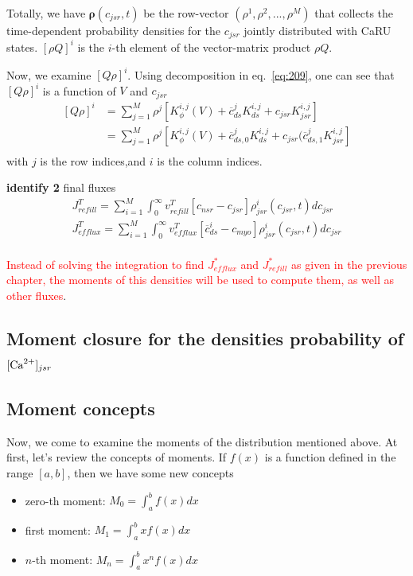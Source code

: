 Totally, we have $\mathbf{\rho} (c_{jsr},t)$ be the row-vector
$(\rho^1, \rho^2, ...,\rho^M)$ that collects the time-dependent
probability densities for the $c_{jsr}$ jointly distributed with CaRU
states. $[\rho Q]^i$ is the $i$-th element of the vector-matrix
product $\rho Q$.

Now, we examine $[Q\rho]^i$. Using decomposition in
eq.~\eqref{eq:209}, one can see that $[Q \rho ]^i$ is a function of
$V$ and $c_{jsr}$
\begin{equation}
  \label{eq:216}
  \begin{split}
    [Q\rho]^i &= \sum_{j=1}^M \rho^j[ K^{i,j}_\phi(V) +
    \overline{c}^j_{ds}K^{i,j}_{ds} +  c_{jsr} K^{i,j}_{jsr} ] \\
    &= \sum_{j=1}^M \rho^j[ K^{i,j}_\phi(V) + \overline{c}^j_{ds,0}K^{i,j}_{ds} +  c_{jsr} (\overline{c}^j_{ds,1}K^{i,j}_{jsr} ] \\
  \end{split}
\end{equation}
with $j$ is the row indices,and $i$ is the column indices. 

{\bf identify 2} final fluxes
\begin{equation}
  \label{eq:217}
  \begin{split}
    J^T_{refill} = \sum_{i=1}^M \int_0^\infty v^T_{refill} [c_{nsr} -
    c_{jsr} ] \rho^i_{jsr} (c_{jsr},t) dc_{jsr}\\
    J^T_{efflux} = \sum_{i=1}^M \int_0^\infty v^T_{efflux} [\overline{c}^i_{ds} -
    c_{myo} ] \rho^i_{jsr} (c_{jsr},t) dc_{jsr}\\
  \end{split}
\end{equation}

\textcolor{red}{Instead of solving the integration to find
  $J^*_{efflux}$ and $J^*_{refill}$ as given in the previous chapter,
  the moments of this densities will be used to compute them, as well
  as other fluxes}.


\subsection{Moment closure for the densities probability of $[{\text{Ca}^{2+}}]_{jsr}$}
\label{sec:moment-jsr}

\subsection{Moment concepts}
\label{sec:moment-concepts}

Now, we come to examine the moments of the distribution mentioned
above. At first, let's review the concepts of moments.  If $f(x)$ is a
function defined in the range $[a,b]$, then we have some new concepts
\begin{itemize}
\item zero-th moment: $M_0 = \int_a^b f(x)dx$
\item first moment: $M_1 = \int_a^b xf(x) dx$
\item $n$-th moment: $M_n=\int_a^b x^nf(x)dx$
\end{itemize}

